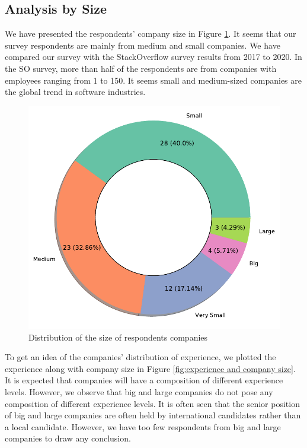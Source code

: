 \subsection{Analysis by Size}
\label{analysis by size}
We have presented the respondents' company size in Figure \ref{fig:company size}. It seems that our survey respondents are mainly from medium and small companies. We have compared our survey with the StackOverflow survey results from 2017 to 2020\cite{StackoverflowSurvey2017,StackoverflowSurvey2018,StackoverflowSurvey2019,StackoverflowSurvey2020}. In the SO survey, more than half of the respondents are from companies with employees ranging from 1 to 150. It seems small and medium-sized companies are the global trend in software industries.

\begin{figure}[h]
\centering
  \includegraphics[scale=0.45]{Figures/Company_Size}
  \caption{Distribution of the size of respondents companies}
  \label{fig:company size}
\end{figure}

To get an idea of the companies' distribution of experience, we plotted the experience along with company size in Figure \ref{fig:experience and company size}. It is expected that companies will have a composition of different experience levels. However, we observe that big and large companies do not pose any composition of different experience levels. It is often seen that the senior position of big and large companies are often held by international candidates rather than a local candidate. However, we have too few respondents from big and large companies to draw any conclusion.

